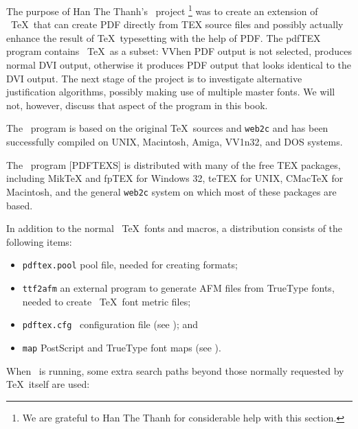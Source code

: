 

The purpose of Han The Thanh's \pdfTEX\  project \footnote{ We are
grateful to Han The Thanh for considerable help with this section. }
was to create an extension of \ \TeX\  that can create PDF directly from
TEX source files and possibly actually enhance the result of \TeX\ 
typesetting with the help of PDF. The pdfTEX program contains \ \TeX\
as a subset: VVhen PDF output is not selected, \pdfTEX produces normal
DVI output, otherwise it produces PDF output that looks identical to the
DVI output. The next stage of the project is to investigate alternative
justification algorithms, possibly making use of multiple master fonts.
We will not, however, discuss that aspect of the program in this book. 

The \pdfTEX\  program is based on the original \TeX\ sources and \verb|web2c| and has 
been successfully compiled on UNIX, Macintosh, Amiga, VV1n32, and DOS systems. 


\isubsubsec{2_4_1_Setting_up_pdfTeX}{Setting up \pdfTEX}

The \pdfTEX\ program [PDFTEXS] is distributed with many of the free TEX
packages, including MikTeX and fpTEX for Windows 32, teTEX for UNIX,
CMacTeX for Macintosh, and the general \verb|web2c| system on which most
of these packages are based. 

In addition to the normal \ \TeX\  fonts and macros, a \pdfTEX distribution consists 
of the following items: 

\begin{itemize}
  \item \verb|pdftex.pool| pool file, needed for creating formats; 
  \item \verb|ttf2afm| an external program to generate AFM files from TrueType fonts, needed 
    to create \ \TeX\  font metric files; 
  \item \verb|pdftex.cfg| \pdfTEX\  configuration file (see ); and 
  \item \verb|map| PostScript and TrueType font maps (see ). 
\end{itemize}

When \pdfTEX\  is running, some extra search paths beyond those normally
requested by \TeX\ itself are used: 


